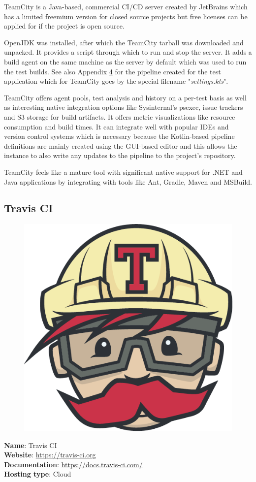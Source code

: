 TeamCity is a Java-based, commercial CI/CD server created by JetBrains which has a limited freemium version for closed source projects but free licenses can be applied for if the project is open source. 

OpenJDK was installed, after which the TeamCity tarball was downloaded and unpacked. It provides a script through which to run and stop the server. It adds a build agent on the same machine as the server by default which was used to run the test builds. See also Appendix \hyperref[chapter:appendix-tc]{4} for the pipeline created for the test application which for TeamCity goes by the special filename "\textit{settings.kts}".

TeamCity offers agent pools, test analysis and history on a per-test basis as well as interesting native integration options like Sysinternal's psexec, issue trackers and S3 storage for build artifacts. It offers metric visualizations like resource consumption and build times. It can integrate well with popular IDEs and version control systems which is necessary because the Kotlin-based pipeline definitions are mainly created using the GUI-based editor and this allows the instance to also write any updates to the pipeline to the project's repository.

TeamCity feels like a mature tool with significant native support for .NET and Java applications by integrating with tools like Ant, Gradle, Maven and MSBuild.
\pagebreak

\subsection{Travis CI}
\begin{figure}
    \vspace{-50pt}
    \includegraphics[width=.25\textwidth]{figures/brand/TravisCI-Mascot-1.png} 
    \vspace{-30pt}
\end{figure}
\textbf{Name}: Travis CI\\
\textbf{Website}: \url{https://travis-ci.org}\\
\textbf{Documentation}: \url{https://docs.travis-ci.com/}\\
\textbf{Hosting type}: Cloud

